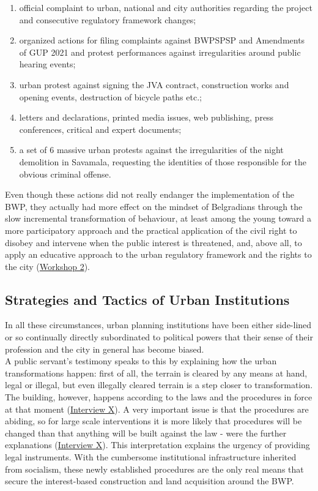 \documentclass[11pt]{report}
\begin{document}
{{{\begin{enumerate}
\item official complaint to urban, national and city authorities regarding the project and consecutive regulatory framework changes;
\item organized actions for filing complaints against BWPSPSP and Amendments of GUP 2021 and protest performances against irregularities around public hearing events;
\item urban protest against signing the JVA contract, construction works and opening events, destruction of bicycle paths etc.;
\item letters and declarations, printed media issues, web publishing, press conferences, critical and expert documents;
\item a set of 6 massive urban protests against the irregularities of the night demolition in Savamala, requesting the identities of those responsible for the obvious criminal offense.

\end{enumerate}

Even though these actions did not really endanger the implementation of the BWP, they actually had more effect on the mindset of Belgradians through the slow incremental transformation of behaviour, at least among the young  toward a more participatory approach and the practical application of the civil right to disobey and intervene when the public interest is threatened, and, above all, to apply an educative approach to the urban regulatory framework and the rights to the city
(\href{PHD Workshop}{Workshop 2}).

\subsection{Strategies and Tactics of Urban Institutions}

In all these circumstances, urban planning institutions have been either side-lined or so continually directly subordinated to political powers that their sense of their profession and the city in general has become biased.
\\

A public servant’s testimony speaks to this by explaining how the urban transformations happen: first of all, the terrain is cleared by any means at hand, legal or illegal, but even illegally cleared terrain is a step closer to transformation. The building, however, happens according to the laws and the procedures in force at that moment (\href{InterviewX}{Interview X}).
A very important issue is that the procedures are abiding, so for large scale interventions it is more likely that procedures will be changed than that anything will be built against the law - were the further explanations  (\href{InterviewX}{Interview X}).
This interpretation explains the urgency of providing legal instruments. With the cumbersome institutional infrastructure inherited from socialism, these newly established procedures are the only real means that secure the interest-based construction and land acquisition around the BWP.
\\

}}}
\end{document}
